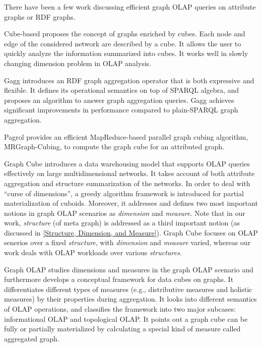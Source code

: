 There have been a few work discussing efficient graph OLAP queries on attribute graphs or RDF graphs.

Cube-based \cite{DBLP:conf/sofsem/JakawatFL16} proposes the concept of  graphs enriched by cubes. Each node and edge of the considered network are described by a cube. It allows the user to quickly analyze the information summarized into cubes. It works well in slowly changing dimension problem in OLAP analysis.

Gagg \cite{DBLP:conf/esws/MaaliCD15} introduces an RDF graph aggregation operator that is both expressive and flexible. It defines its operational semantics on top of SPARQL algebra, and proposes an algorithm to answer graph aggregation queries. Gagg achieves significant improvements in performance compared to plain-SPARQL graph aggregation.

Pagrol \cite{DBLP:conf/icde/WangFWTAA14} provides an efficient MapReduce-based parallel graph cubing algorithm, MRGraph-Cubing, to compute the graph cube for an attributed graph.

Graph Cube \cite{DBLP:conf/sigmod/ZhaoLXH11} introduces a data warehousing model that supports OLAP queries effectively on large multidimensional networks. It takes account of both attribute aggregation and structure summarization of the networks. In order to deal with ``curse of dimensions'', a greedy algorithm framework is introduced for partial materialization of cuboids. Moreover, it addresses and defines two most important notions in graph OLAP scenarios as \textit{dimension} and \textit{measure}. Note that in our work, \textit{structure} (of meta graph) is addressed as a third important notion (as discussed in \ref{Structure, Dimension, and Measure}). Graph Cube \cite{DBLP:conf/sigmod/ZhaoLXH11} focuses on OLAP senerios over a fixed \textit{structure}, with \textit{dimension} and \textit{measure} varied, whereas our work deals with OLAP workloads over various \textit{structures}. %

Graph OLAP \cite{DBLP:conf/icdm/ChenYZHY08} studies dimensions and measures in the graph OLAP scenario and furthermore develops a conceptual framework for data cubes on graphs. It differentiates different types of measures (e.g., distributive measures and holistic measures) by their properties during aggregation. It looks into different semantics of OLAP operations, and classifies the framework into two major subcases: informational OLAP and topological OLAP. It points out a graph cube can be fully or partially materialized by calculating a special kind of measure called aggregated graph.

